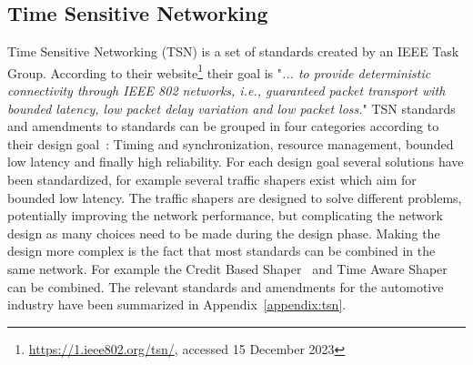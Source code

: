 \subsection{Time Sensitive Networking}
\label{sec:tsn}
Time Sensitive Networking (TSN) is a set of standards created by an IEEE Task Group. According to their website\footnote{\url{https://1.ieee802.org/tsn/}, accessed 15 December 2023} their goal is "\textit{... to provide deterministic connectivity through IEEE 802 networks, i.e., guaranteed packet transport with bounded latency, low packet delay variation and low packet loss.}" TSN standards and amendments to standards can be grouped in four categories according to their design goal~\cite{ashjaei2021time}: Timing and synchronization, resource management, bounded low latency and finally high reliability. For each design goal several solutions have been standardized, for example several traffic shapers exist which aim for bounded low latency. The traffic shapers are designed to solve different problems, potentially improving the network performance, but complicating the network design as many choices need to be made during the design phase. Making the design more complex is the fact that most standards can be combined in the same network. For example the Credit Based Shaper~\cite{IEEE8021Qav} and Time Aware Shaper~\cite{IEEE8021Qbv} can be combined. The relevant standards and amendments for the automotive industry have been summarized in Appendix~\ref{appendix:tsn}.